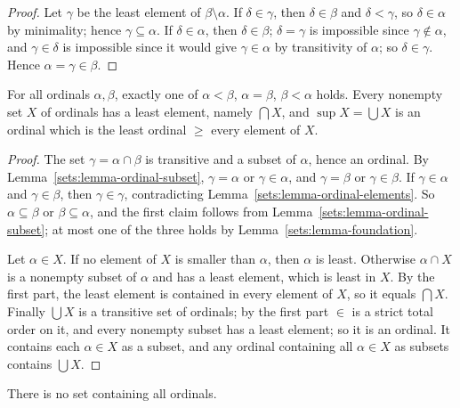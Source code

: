 \begin{proof}
Let $\gamma$ be the least element of $\beta \setminus \alpha$. If
$\delta \in \gamma$, then $\delta \in \beta$ and $\delta < \gamma$, so
$\delta \in \alpha$ by minimality; hence $\gamma \subseteq \alpha$. If
$\delta \in \alpha$, then $\delta \in \beta$; $\delta = \gamma$ is impossible
since $\gamma \notin \alpha$, and $\gamma \in \delta$ is impossible since it
would give $\gamma \in \alpha$ by transitivity of $\alpha$; so $\delta \in \gamma$.
Hence $\alpha = \gamma \in \beta$.
\end{proof}

\begin{theorem}\label{sets:theorem-ordinals-comparable}
For all ordinals $\alpha, \beta$, exactly one of $\alpha < \beta$,
$\alpha = \beta$, $\beta < \alpha$ holds. Every nonempty set $X$ of ordinals has
a least element, namely $\bigcap X$, and $\sup X = \bigcup X$ is an ordinal
which is the least ordinal $\geq$ every element of $X$.
\end{theorem}

\begin{proof}
The set $\gamma = \alpha \cap \beta$ is transitive and a subset of $\alpha$,
hence an ordinal. By Lemma~\ref{sets:lemma-ordinal-subset}, $\gamma = \alpha$
or $\gamma \in \alpha$, and $\gamma = \beta$ or $\gamma \in \beta$. If
$\gamma \in \alpha$ and $\gamma \in \beta$, then $\gamma \in \gamma$,
contradicting Lemma~\ref{sets:lemma-ordinal-elements}. So $\alpha \subseteq \beta$
or $\beta \subseteq \alpha$, and the first claim follows from
Lemma~\ref{sets:lemma-ordinal-subset}; at most one of the three holds by
Lemma~\ref{sets:lemma-foundation}.

Let $\alpha \in X$. If no element of $X$ is smaller than $\alpha$, then
$\alpha$ is least. Otherwise $\alpha \cap X$ is a nonempty subset of $\alpha$
and has a least element, which is least in $X$. By the first part, the least
element is contained in every element of $X$, so it equals $\bigcap X$. Finally
$\bigcup X$ is a transitive set of ordinals; by the first part $\in$ is a
strict total order on it, and every nonempty subset has a least element; so
it is an ordinal. It contains each $\alpha \in X$ as a subset, and any ordinal
containing all $\alpha \in X$ as subsets contains $\bigcup X$.
\end{proof}

\begin{proposition}\label{sets:proposition-burali-forti}
There is no set containing all ordinals.
\end{proposition}

